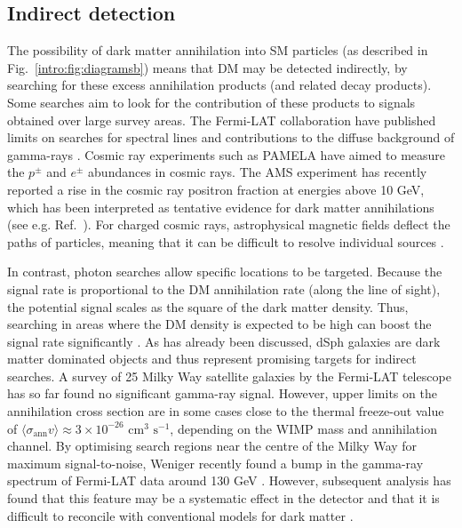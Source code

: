 \subsection{Indirect detection}


The possibility of dark matter annihilation into SM particles (as described in Fig.~\ref{intro:fig:diagramsb}) means that DM may be detected indirectly, by searching for these excess annihilation products (and related decay products). Some searches aim to look for the contribution of these products to signals obtained over large survey areas. The Fermi-LAT collaboration have published limits on searches for spectral lines and contributions to the diffuse background of gamma-rays \cite{Ackermann:2012}. Cosmic ray experiments such as PAMELA \cite{Boezio:2009} have aimed to measure the $p^{\pm}$ and $e^{\pm}$ abundances in cosmic rays. The AMS experiment \cite{Aguilar:2013} has recently reported a rise in the cosmic ray positron fraction at energies above 10 GeV, which has been interpreted as tentative evidence for dark matter annihilations (see e.g. Ref.~\cite{Ibarra:2014}). For charged cosmic rays, astrophysical magnetic fields deflect the paths of particles, meaning that it can be difficult to resolve individual sources \cite{Medina:1998}.

 In contrast, photon searches allow specific locations to be targeted. Because the signal rate is proportional to the DM annihilation rate (along the line of sight), the potential signal scales as the square of the dark matter density. Thus, searching in areas where the DM density is expected to be high can boost the signal rate significantly \cite{Lavalle:2008}. As has already been discussed, dSph galaxies are dark matter dominated objects and thus represent promising targets for indirect searches. A survey of 25 Milky Way satellite galaxies by the Fermi-LAT telescope \cite{Ackermann:2014} has so far found no significant gamma-ray signal. However, upper limits on the annihilation cross section are in some cases close to the thermal freeze-out value of $\langle \sigma_\mathrm{ann} v \rangle \approx 3 \times 10^{-26} \textrm{ cm}^{3} \textrm{ s}^{-1}$, depending on the WIMP mass and annihilation channel. By optimising search regions near the centre of the Milky Way for maximum signal-to-noise, Weniger recently found a bump in the gamma-ray spectrum of Fermi-LAT data around 130 GeV \cite{Weniger:2012}. However, subsequent analysis has found that this feature may be a systematic effect in the detector \cite{Bloom:2013} and that it is difficult to reconcile with conventional models for dark matter \cite{Buchmuller:2012, Cohen:2012}.

